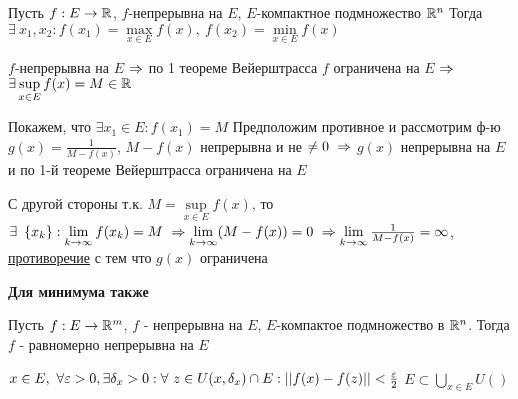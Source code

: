 \begin{proofs}
	Пусть $f:E \to \mathbb{R}$, $f$-непрерывна на $E$, $E$-компактное подмножество $\mathbb{R}^n$ Тогда $\exists \ x_1,x_2 : f(x_1)=\max\limits_{x \in E}f(x), \ f(x_2)=\min\limits_{x \in E}f(x)$
	\begin{dokvo}
		$f$-непрерывна на $E$ $\Rightarrow$ по 1 теореме Вейерштрасса $f$ ограничена на $E$ $\Rightarrow$ $\exists \sup\limits_{x\in E}f(x)=M\in \mathbb{R}$

		Покажем, что $\exists x_1 \in E : f(x_1)=M$ Предположим противное и рассмотрим ф-ю $g(x) = \frac{1}{M-f(x)}$, $M-f(x)$ непрерывна и не $\neq 0 \ \Rightarrow$ $g(x)$ непрерывна на $E$ и по 1-й теореме Вейерштрасса ограничена на $E$

		С другой стороны т.к. $M=\sup\limits_{x\in E}f(x)$, то $\exists \ \left\{ x_k\right\}: \lim\limits_{k\to \infty}f(x_k)=M \ \Rightarrow \lim\limits_{k\to \infty}(M-f(x))=0 \ \Rightarrow \lim\limits_{k\to \infty}\frac{1}{M-f(x)}=\infty$, \underline{противоречие} с тем что $g(x)$ ограничена

		\textbf{Для минимума также}
	\end{dokvo}
\end{proofs}

\begin{proofs}
	Пусть $f:E\to \mathbb{R}^m$, $f$ - непрерывна на $E$, $E$-компактое подмножество в $\mathbb{R}^n$. Тогда $f$ - равномерно непрерывна на $E$
	\begin{dokvo}
		$x \in E, \ \forall \varepsilon > 0, \exists \delta_x > 0: \forall \ z\in U(x, \delta_x)\cap E: \left|\left| f(x)-f(z)\right|\right|< \frac{\varepsilon}{2}$
		$E \subset \bigcup\limits_{x\in E}U()$
	\end{dokvo}

\end{proofs}
